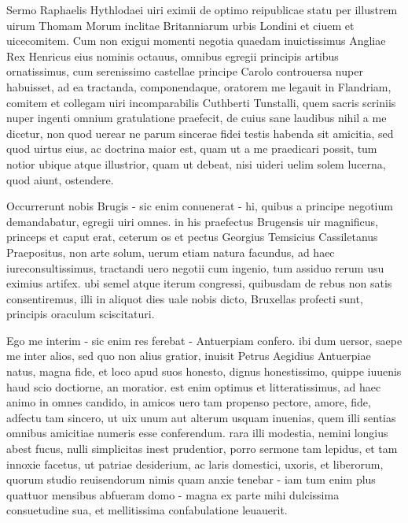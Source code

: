 \documentclass[12pt,a4paper]{article}
\begin{document}
\maketitle

        Sermo Raphaelis Hythlodaei uiri eximii de optimo reipublicae statu per illustrem uirum Thomam Morum inclitae Britanniarum urbis Londini et ciuem et uicecomitem. 
Cum non exigui momenti negotia quaedam inuictissimus Angliae Rex Henricus eius 
nominis octauus, omnibus egregii principis artibus ornatissimus, cum serenissimo 
castellae principe Carolo controuersa nuper habuisset, ad ea tractanda, 
componendaque, oratorem me legauit in Flandriam, comitem et collegam uiri 
incomparabilis Cuthberti Tunstalli, quem sacris scriniis nuper ingenti omnium 
gratulatione praefecit, de cuius sane laudibus nihil a me dicetur, non quod 
uerear ne parum sincerae fidei testis habenda sit amicitia, sed quod uirtus 
eius, ac doctrina maior est, quam ut a me praedicari possit, tum notior ubique 
atque illustrior, quam ut debeat, nisi uideri uelim solem lucerna, quod aiunt, 
ostendere. 

Occurrerunt nobis Brugis - sic enim conuenerat - hi, quibus a principe negotium 
demandabatur, egregii uiri omnes. in his praefectus Brugensis uir magnificus, 
princeps et caput erat, ceterum os et pectus Georgius Temsicius Cassiletanus 
Praepositus, non arte solum, uerum etiam natura facundus, ad haec 
iureconsultissimus, tractandi uero negotii cum ingenio, tum assiduo rerum usu 
eximius artifex. ubi semel atque iterum congressi, quibusdam de rebus non satis 
consentiremus, illi in aliquot dies uale nobis dicto, Bruxellas profecti sunt, 
principis oraculum sciscitaturi. 

Ego me interim - sic enim res ferebat - Antuerpiam confero. ibi dum uersor, 
saepe me inter alios, sed quo non alius gratior, inuisit Petrus Aegidius 
Antuerpiae natus, magna fide, et loco apud suos honesto, dignus honestissimo, 
quippe iuuenis haud scio doctiorne, an moratior. est enim optimus et 
litteratissimus, ad haec animo in omnes candido, in amicos uero tam propenso 
pectore, amore, fide, adfectu tam sincero, ut uix unum aut alterum usquam 
inuenias, quem illi sentias omnibus amicitiae numeris esse conferendum. rara 
illi modestia, nemini longius abest fucus, nulli simplicitas inest prudentior, 
porro sermone tam lepidus, et tam innoxie facetus, ut patriae desiderium, ac 
laris domestici, uxoris, et liberorum, quorum studio reuisendorum nimis quam 
anxie tenebar - iam tum enim plus quattuor mensibus abfueram domo - magna ex 
parte mihi dulcissima consuetudine sua, et mellitissima confabulatione 
leuauerit. 
\end{document}
